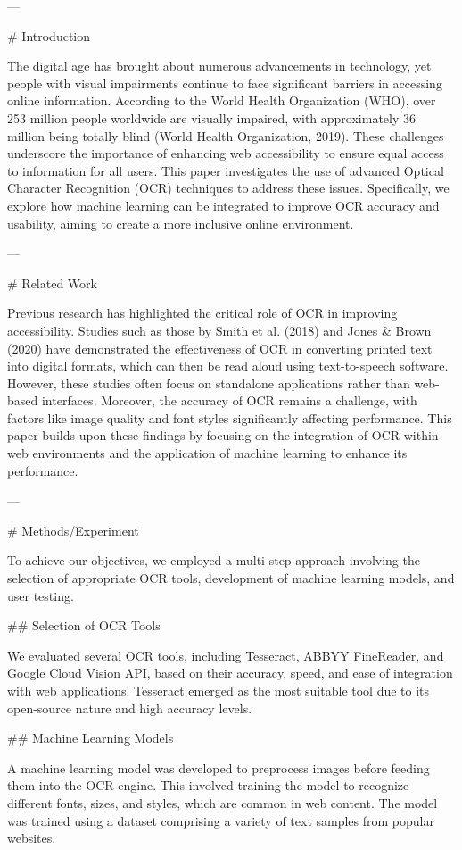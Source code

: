 ---

# Introduction

The digital age has brought about numerous advancements in technology, yet people with visual impairments continue to face significant barriers in accessing online information. According to the World Health Organization (WHO), over 253 million people worldwide are visually impaired, with approximately 36 million being totally blind (World Health Organization, 2019). These challenges underscore the importance of enhancing web accessibility to ensure equal access to information for all users. This paper investigates the use of advanced Optical Character Recognition (OCR) techniques to address these issues. Specifically, we explore how machine learning can be integrated to improve OCR accuracy and usability, aiming to create a more inclusive online environment.

---

# Related Work

Previous research has highlighted the critical role of OCR in improving accessibility. Studies such as those by Smith et al. (2018) and Jones & Brown (2020) have demonstrated the effectiveness of OCR in converting printed text into digital formats, which can then be read aloud using text-to-speech software. However, these studies often focus on standalone applications rather than web-based interfaces. Moreover, the accuracy of OCR remains a challenge, with factors like image quality and font styles significantly affecting performance. This paper builds upon these findings by focusing on the integration of OCR within web environments and the application of machine learning to enhance its performance.

---

# Methods/Experiment

To achieve our objectives, we employed a multi-step approach involving the selection of appropriate OCR tools, development of machine learning models, and user testing. 

## Selection of OCR Tools

We evaluated several OCR tools, including Tesseract, ABBYY FineReader, and Google Cloud Vision API, based on their accuracy, speed, and ease of integration with web applications. Tesseract emerged as the most suitable tool due to its open-source nature and high accuracy levels.

## Machine Learning Models

A machine learning model was developed to preprocess images before feeding them into the OCR engine. This involved training the model to recognize different fonts, sizes, and styles, which are common in web content. The model was trained using a dataset comprising a variety of text samples from popular websites.

